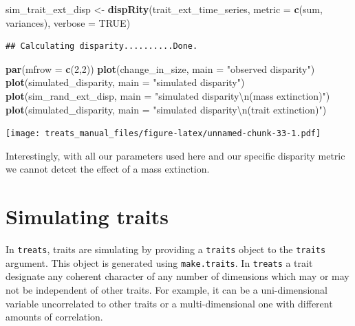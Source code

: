 \documentclass[
]{book}
\newenvironment{Shaded}{\begin{snugshade}}{\end{snugshade}}
\newcommand{\CharTok}[1]{\textcolor[rgb]{0.31,0.60,0.02}{#1}}
\newcommand{\DataTypeTok}[1]{\textcolor[rgb]{0.13,0.29,0.53}{#1}}
\newcommand{\DecValTok}[1]{\textcolor[rgb]{0.00,0.00,0.81}{#1}}
\newcommand{\KeywordTok}[1]{\textcolor[rgb]{0.13,0.29,0.53}{\textbf{#1}}}
\newcommand{\NormalTok}[1]{#1}
\newcommand{\OtherTok}[1]{\textcolor[rgb]{0.56,0.35,0.01}{#1}}
\newcommand{\StringTok}[1]{\textcolor[rgb]{0.31,0.60,0.02}{#1}}
\begin{document}
\begin{Shaded}
\begin{Highlighting}[]
\NormalTok{sim\_trait\_ext\_disp \textless{}{-}}\StringTok{ }\KeywordTok{dispRity}\NormalTok{(trait\_ext\_time\_series, }\DataTypeTok{metric =} \KeywordTok{c}\NormalTok{(sum, variances),}
                               \DataTypeTok{verbose =} \OtherTok{TRUE}\NormalTok{)}
\end{Highlighting}
\end{Shaded}

\begin{verbatim}
## Calculating disparity..........Done.
\end{verbatim}

\begin{Shaded}
\begin{Highlighting}[]
\KeywordTok{par}\NormalTok{(}\DataTypeTok{mfrow =} \KeywordTok{c}\NormalTok{(}\DecValTok{2}\NormalTok{,}\DecValTok{2}\NormalTok{))}
\KeywordTok{plot}\NormalTok{(change\_in\_size, }\DataTypeTok{main =} \StringTok{"observed disparity"}\NormalTok{)}
\KeywordTok{plot}\NormalTok{(simulated\_disparity, }\DataTypeTok{main =} \StringTok{"simulated disparity"}\NormalTok{)}
\KeywordTok{plot}\NormalTok{(sim\_rand\_ext\_disp, }\DataTypeTok{main =} \StringTok{"simulated disparity}\CharTok{\textbackslash{}n}\StringTok{(mass extinction)"}\NormalTok{)}
\KeywordTok{plot}\NormalTok{(simulated\_disparity, }\DataTypeTok{main =} \StringTok{"simulated disparity}\CharTok{\textbackslash{}n}\StringTok{(trait extinction)"}\NormalTok{)}
\end{Highlighting}
\end{Shaded}

\texttt{[image: treats\_manual\_files/figure-latex/unnamed-chunk-33-1.pdf]}

Interestingly, with all our parameters used here and our specific disparity metric we cannot detcet the effect of a mass extinction.

\hypertarget{maketraits}{%
\chapter{Simulating traits}\label{maketraits}}

In \texttt{treats}, traits are simulating by providing a \texttt{traits} object to the \texttt{traits} argument.
This object is generated using \texttt{make.traits}.
In \texttt{treats} a trait designate any coherent character of any number of dimensions which may or may not be independent of other traits.
For example, it can be a uni-dimensional variable uncorrelated to other traits or a multi-dimensional one with different amounts of correlation.
\end{document}

